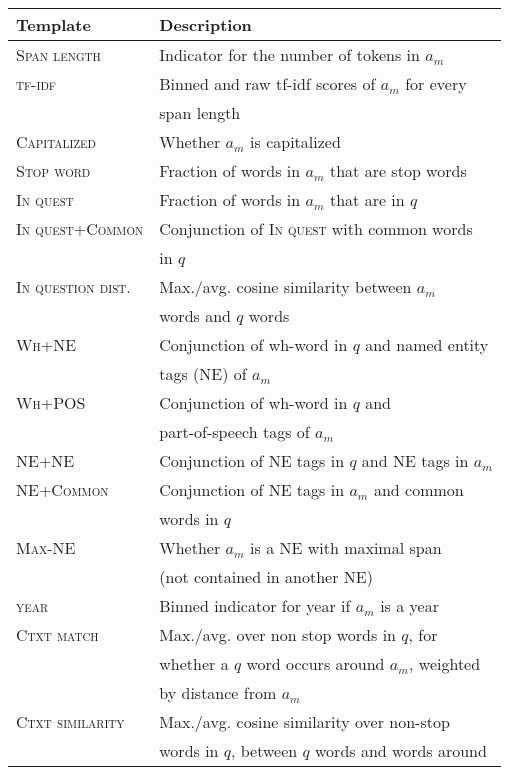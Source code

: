 \documentclass[11pt,a4paper]{article}
\begin{document}
\begin{table}[t]
\begin{center}
\scriptsize{
\begin{tabular}{l|l}
 \toprule
 \textbf{Template} & \textbf{Description}  \\ 
 \midrule
\textsc{Span length} & Indicator for the number of tokens in $a_m$    \\ 
\textsc{tf-idf} & Binned and raw tf-idf scores of $a_m$ for every \\ & span length  \\ 
\textsc{Capitalized} & Whether $a_m$ is capitalized  \\ 
\textsc{Stop word} & Fraction of words in $a_m$ that are stop words  \\ 
\textsc{In quest} & Fraction of words in $a_m$ that are in $q$\\
\textsc{In quest+Common} & Conjunction of \textsc{In quest} with common words \\ & in $q$ \\ 
\textsc{In question dist.} & Max./avg.
cosine similarity between $a_m$ \\ & words and $q$ words\\
\textsc{Wh+NE} & Conjunction of wh-word in $q$ and named entity \\ & tags (NE) of $a_m$\\
\textsc{Wh+POS} & Conjunction of wh-word in $q$ and \\ & part-of-speech tags of $a_m$\\
\textsc{NE+NE} & Conjunction of NE tags in $q$ and NE tags in $a_m$\\
\textsc{NE+Common} & Conjunction of NE tags in $a_m$ and common \\ & words in $q$ \\
\textsc{Max-NE} & Whether $a_m$ is a NE with maximal span \\ &  (not contained in another NE) \\
\textsc{year} & Binned indicator for year if $a_m$ is a year \\
\midrule
\textsc{Ctxt match} & Max./avg. over non stop words in $q$, for \\ & whether a $q$ word    occurs around $a_m$, weighted \\ & by distance  from $a_m$ \\
\textsc{Ctxt similarity} & Max./avg. cosine similarity over non-stop \\
& words in $q$, between $q$ words and words around \\

\end{tabular}}
\end{center}
\end{table}
\end{document}

